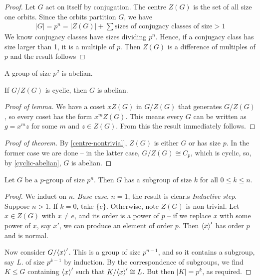 \documentclass{../template/note}
\begin{document}
    \begin{proof}
        Let $G$ act on itself by conjugation. The centre $Z(G)$ is the set of all size one orbits. Since the orbits partition $G$, we have
        \begin{align*}
            |G| = p^n = |Z(G)| + \sum \text{sizes of conjugacy classes of size} >1
        \end{align*}
        We know conjugacy classes have sizes dividing $p^n$. Hence, if a conjugacy class has size larger than 1, it is a multiple of $p$. Then $Z(G)$ is a difference of multiples of $p$ and the result follows
    \end{proof}
    
    \begin{theorem}
        A group of size $p^2$ is abelian.
    \end{theorem}
    
    \begin{lemma}
        If $G/Z(G)$ is cyclic, then $G$ is abelian.
        \label{cyclic-abelian}
    \end{lemma}
    
    \begin{proof}[Proof of lemma]
        We have a coset $xZ(G)$ in $G/Z(G)$ that generates $G/Z(G)$, so every coset has the form $x^mZ(G)$. This means every $G$ can be written as $g=x^mz$ for some $m$ and $z \in Z(G)$. From this the result immediately follows.
    \end{proof}
    
    \begin{proof}[Proof of theorem]
        By \cref{centre-nontrivial}, $Z(G)$ is either $G$ or has size $p$. In the former case we are done -- in the latter case, $G/Z(G) \cong C_p$, which is cyclic, so, by \cref{cyclic-abelian}, $G$ is abelian.
    \end{proof}
    
    \begin{theorem}
        Let $G$ be a $p$-group of size $p^n$. Then $G$ has a subgroup of size $k$ for all $0 \leq k \leq n$.
    \end{theorem}
    
    \begin{proof}
        We induct on $n$.
        \emph{Base case}. $n=1$, the result is clear.s
        \emph{Inductive step}. Suppose $n > 1$. If $k=0$, take $\{e\}$. Otherwise, note $Z(G)$ is non-trivial. Let $x \in Z(G)$ with $x \neq e$, and its order is a power of $p$ -- if we replace $x$ with some power of $x$, say $x'$, we can produce an element of order $p$. Then $\left \langle x \right \rangle'$ has order $p$ and is normal.

        Now consider $G/\!\left \langle x \right \rangle'$. This is a group of size $p^{n-1}$, and so it contains a subgroup, say $L$. of size $p^{k-1}$ by induction. By the correspondence of subgroups, we find $K \leq G$ containing $\left \langle x \right \rangle'$ such that $K/\!\left \langle x \right \rangle' \cong L$. But then $|K| = p^k$, as required.
    \end{proof}
    
\end{document}
